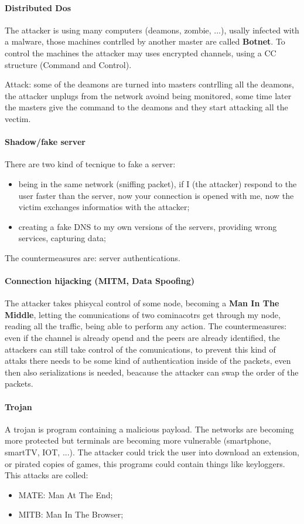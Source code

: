 \documentclass[12pt]{article}
\begin{document}
\paragraph{Distributed Dos}
The attacker is using many computers (deamons, zombie, ...), usally infected with a malware, those machines contrlled by another master are called \textbf{Botnet}. To control the machines the attacker may uses encrypted channels, using a CC structure (Command and Control).

Attack: some of the deamons are turned into masters contrlling all the deamons, the attacker unplugs from the network avoind being monitored, some time later the masters give the command to the deamons and they start attacking all the vectim.

\paragraph{Shadow/fake server}
There are two kind of tecnique to fake a server:
\begin{itemize}
    \item being in the same network (sniffing packet), if I (the attacker) respond to the user faster than the server, now your connection is opened with me, now the victim exchanges informatios with the attacker;
    \item creating a fake DNS to my own versions of the servers, providing wrong services, capturing data;
\end{itemize}
The countermeasures are: server authentications.

\paragraph{Connection hijacking (MITM, Data Spoofing)}
The attacker takes phisycal control of some node, becoming a \textbf{Man In The Middle}, letting the comunications of two cominacotrs get through my node, reading all the traffic, being able to perform any action. The countermeasures: even if the channel is already opend and the peers are already identified, the attackers can still take control of the comunications, to prevent this kind of attaks there needs to be some kind of authentication inside of the packets, even then also serializations is needed, beacause the attacker can swap the order of the packets.

\paragraph{Trojan}
A trojan is program containing a malicious payload. The networks are becoming more protected but terminals are becoming more vulnerable (smartphone, smartTV, IOT, ...). The attacker could trick the user into download an extension, or pirated copies of games, this programs could contain things like keyloggers. This attacks are colled:
\begin{itemize}
    \item MATE: Man At The End;
    \item MITB: Man In The Browser;
\end{itemize}
\end{document}

